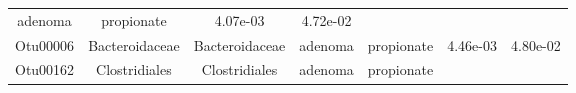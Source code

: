 \documentclass[11pt,]{article}
\begin{document}
\begin{longtable}[]{@{}ccccccc@{}}
\begin{minipage}[t]{0.09\columnwidth}
adenoma\strut
\end{minipage} & \begin{minipage}[t]{0.11\columnwidth}\centering\strut
propionate\strut
\end{minipage} & \begin{minipage}[t]{0.09\columnwidth}\centering\strut
4.07e-03\strut
\end{minipage} & \begin{minipage}[t]{0.09\columnwidth}\centering\strut
4.72e-02\strut
\end{minipage}\tabularnewline
\begin{minipage}[t]{0.09\columnwidth}\centering\strut
Otu00006\strut
\end{minipage} & \begin{minipage}[t]{0.17\columnwidth}\centering\strut
Bacteroidaceae\strut
\end{minipage} & \begin{minipage}[t]{0.17\columnwidth}\centering\strut
Bacteroidaceae\strut
\end{minipage} & \begin{minipage}[t]{0.09\columnwidth}\centering\strut
adenoma\strut
\end{minipage} & \begin{minipage}[t]{0.11\columnwidth}\centering\strut
propionate\strut
\end{minipage} & \begin{minipage}[t]{0.09\columnwidth}\centering\strut
4.46e-03\strut
\end{minipage} & \begin{minipage}[t]{0.09\columnwidth}\centering\strut
4.80e-02\strut
\end{minipage}\tabularnewline
\begin{minipage}[t]{0.09\columnwidth}\centering\strut
Otu00162\strut
\end{minipage} & \begin{minipage}[t]{0.17\columnwidth}\centering\strut
Clostridiales\strut
\end{minipage} & \begin{minipage}[t]{0.17\columnwidth}\centering\strut
Clostridiales\strut
\end{minipage} & \begin{minipage}[t]{0.09\columnwidth}\centering\strut
adenoma\strut
\end{minipage} & \begin{minipage}[t]{0.11\columnwidth}\centering\strut
propionate\strut
\end{minipage} & \begin{minipage}[t]{0.09\columnwidth}\centering\strut

\end{minipage}
\end{longtable}
\end{document}
